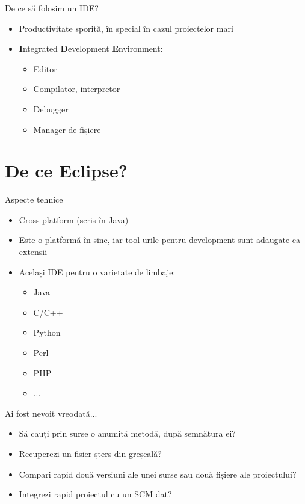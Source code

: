 \documentclass{beamer}
\begin{document}
\begin{frame}{De ce să folosim un IDE?}
  \begin{itemize}
  \pause
  \item Productivitate sporită, în special în cazul proiectelor mari
  \pause
  \item \textbf{I}ntegrated \textbf{D}evelopment \textbf{E}nvironment:
		\begin{itemize} 
		\pause
	  \item Editor
  	\pause
	  \item Compilator, interpretor
  	\pause
	  \item Debugger
		\pause
	  \item Manager de fișiere
  	\end{itemize}
  \end{itemize}
\end{frame}

\section{De ce Eclipse?}

\begin{frame}{Aspecte tehnice}
  \begin{itemize}
  \pause
  \item Cross platform (scris în Java)
  \pause
  \item Este o platformă în sine, iar tool-urile pentru development sunt adaugate ca extensii
  \pause
  \item Același IDE pentru o varietate de limbaje:
		\begin{itemize} 
		\pause
	  \item Java
  	\pause
	  \item C/C++	
  	\pause
	  \item Python
		\pause
	  \item Perl
	  \pause
	  \item PHP
	  \pause
	  \item ...
  	\end{itemize}
\end{itemize}    
\end{frame}

\begin{frame}{Ai fost nevoit vreodată...}
		\begin{itemize} 
		\pause
	  \item Să cauți prin surse o anumită metodă, după semnătura ei?
  	\pause
	  \item Recuperezi un fișier șters din greșeală?
  	\pause
	  \item Compari rapid două versiuni ale unei surse sau două fișiere ale proiectului? 
		\pause
	  \item Integrezi rapid proiectul cu un SCM dat?
  	\end{itemize}
\end{frame}
\end{document}
